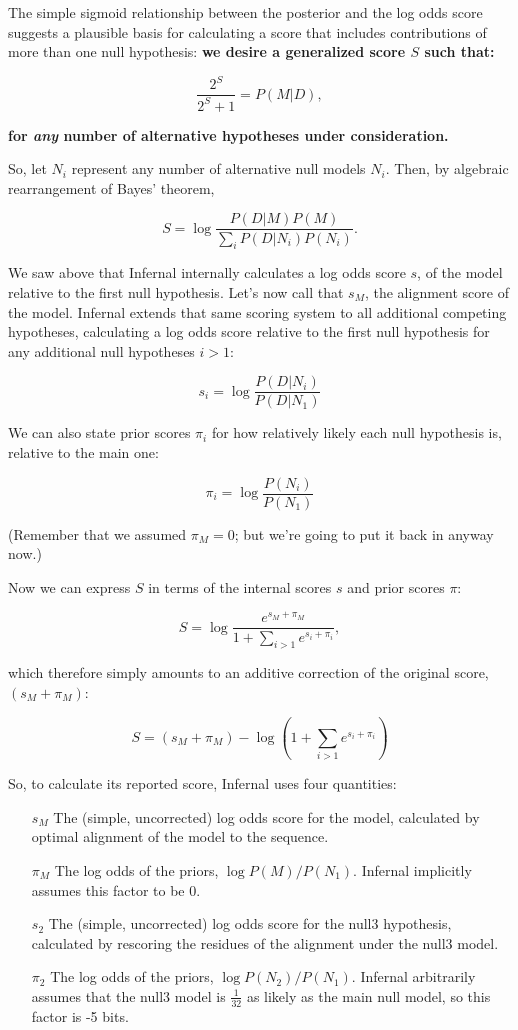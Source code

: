The simple sigmoid relationship between the posterior and the log odds
score suggests a plausible basis for calculating a score that includes
contributions of more than one null hypothesis: \textbf{we desire a
generalized score $S$ such that:}

\[
  \frac{2^S}{2^S + 1} = P(M | D),
\]

\textbf{for \emph{any} number of alternative hypotheses under consideration.}

So, let $N_i$ represent any number of alternative null models
$N_i$. Then, by algebraic rearrangement of Bayes' theorem,

\[
   S = \log \frac{P(D | M) P(M)}{ \sum_{i} P(D | N_i) P(N_i)}. 
\]

We saw above that Infernal internally calculates a log odds score $s$, of
the model relative to the first null hypothesis. Let's now call that
$s_M$, the alignment score of the model. Infernal extends that same
scoring system to all additional competing hypotheses, calculating a
log odds score relative to the first null hypothesis for any
additional null hypotheses $i > 1$:

\[
  s_i = \log \frac{P(D | N_i)}{P(D | N_1)}
\]

We can also state prior scores $\pi_i$ for how relatively likely
each null hypothesis is, relative to the main one:

\[
  \pi_i = \log \frac{P(N_i)}{P(N_1)}
\]

(Remember that we assumed $\pi_M = 0$; but we're going to put it back
in anyway now.)

Now we can express $S$ in terms of the internal scores $s$ and
prior scores $\pi$:

\[
   S = \log  \frac{e^{s_M + \pi_M}} { 1 + \sum_{i>1} e^{s_i + \pi_i}},
\]

which therefore simply amounts to an additive correction of the
original score, $(s_M + \pi_M)$:

\[
  S = (s_M + \pi_M) - \log \left( 1 + \sum_{i>1} e^{s_i + \pi_i} \right)
\]

So, to calculate its reported score, Infernal uses four quantities:

\begin{enumerate}
\item [$s_M$] The (simple, uncorrected) log odds score for the model,
calculated by optimal alignment of the model to the sequence.

\item [$\pi_M$] The log odds of the priors, $\log P(M)/P(N_1)$. Infernal
   implicitly assumes this factor to be 0.

\item [$s_2$] The (simple, uncorrected) log odds score
   for the null3 hypothesis, calculated by rescoring the residues
   of the alignment under the null3 model.

\item [$\pi_2$] The log odds of the priors, $\log P(N_2)/P(N_1)$. 
Infernal arbitrarily assumes that the null3 model is
$\frac{1}{32}$ as likely as the main null model, so this factor
is -5 bits.
\end{enumerate}


